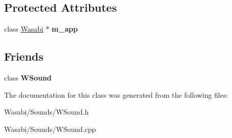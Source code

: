 \subsection*{Protected Attributes}
\begin{DoxyCompactItemize}
\item 
class \hyperlink{class_wasabi}{Wasabi} $\ast$ {\bfseries m\+\_\+app}\hypertarget{class_w_sound_component_a2323ae15b9056da122f3f833842d9c9b}{}\label{class_w_sound_component_a2323ae15b9056da122f3f833842d9c9b}

\end{DoxyCompactItemize}
\subsection*{Friends}
\begin{DoxyCompactItemize}
\item 
class {\bfseries W\+Sound}\hypertarget{class_w_sound_component_a4a64c7f6f9c636a47bdf6fd833d4de2f}{}\label{class_w_sound_component_a4a64c7f6f9c636a47bdf6fd833d4de2f}

\end{DoxyCompactItemize}


The documentation for this class was generated from the following files\+:\begin{DoxyCompactItemize}
\item 
Wasabi/\+Sounds/W\+Sound.\+h\item 
Wasabi/\+Sounds/W\+Sound.\+cpp\end{DoxyCompactItemize}
